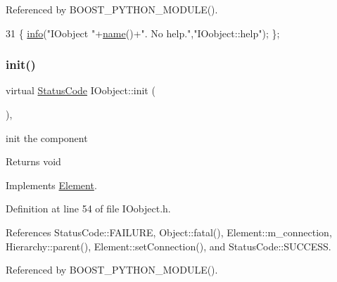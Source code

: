 Referenced by B\+O\+O\+S\+T\+\_\+\+P\+Y\+T\+H\+O\+N\+\_\+\+M\+O\+D\+U\+L\+E().


\begin{DoxyCode}
31 \{ \hyperlink{classObject_a644fd329ea4cb85f54fa6846484b84a8}{info}(\textcolor{stringliteral}{"IOobject "}+\hyperlink{classObject_a300f4c05dd468c7bb8b3c968868443c1}{name}()+\textcolor{stringliteral}{". No help."},\textcolor{stringliteral}{"IOobject::help"}); \};
\end{DoxyCode}
\mbox{\label{classIOobject_ab989e175734dd73797343e63cec6b174}} 
\subsubsection{\texorpdfstring{init()}{init()}}
{\footnotesize\ttfamily virtual \hyperlink{classStatusCode}{Status\+Code} I\+Oobject\+::init (\begin{DoxyParamCaption}{ }\end{DoxyParamCaption})\hspace{0.3cm}{\ttfamily [inline]}, {\ttfamily [virtual]}}

init the component

\begin{DoxyReturn}{Returns}
void 
\end{DoxyReturn}


Implements \hyperlink{classElement_af42754b5cabc198869222725218d695c}{Element}.



Definition at line 54 of file I\+Oobject.\+h.



References Status\+Code\+::\+F\+A\+I\+L\+U\+RE, Object\+::fatal(), Element\+::m\+\_\+connection, Hierarchy\+::parent(), Element\+::set\+Connection(), and Status\+Code\+::\+S\+U\+C\+C\+E\+SS.



Referenced by B\+O\+O\+S\+T\+\_\+\+P\+Y\+T\+H\+O\+N\+\_\+\+M\+O\+D\+U\+L\+E().


